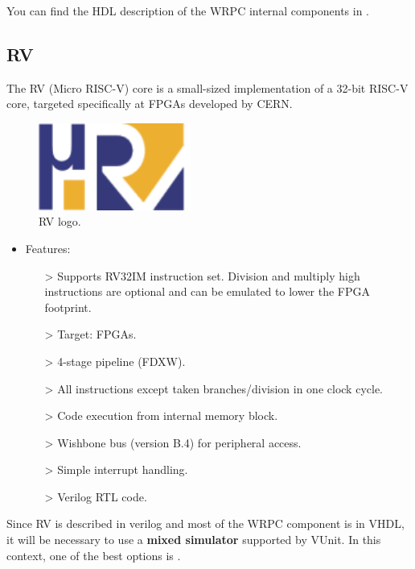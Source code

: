 \noindent You can find the HDL description of the WRPC internal components in \cite{WRPC:modules}.

\newpage

\subsection{\textmu RV}

The \textmu RV \cite{urv-core:ohwr} \cite{urv-core:wiki} \cite{Włostowski:2213516} (Micro RISC-V) core is a small-sized implementation of a 32-bit RISC-V core, targeted specifically at FPGAs developed by CERN. 

\begin{figure}[H]
    \centering
    \includegraphics[width=5cm]{figures/urv_logo.png}
    \caption{\textmu RV logo.}
    \label{fig:urv}
\end{figure}

\begin{itemize}
\item Features:
    \begin{itemize}
    \item[>] Supports RV32IM instruction set. 
Division and multiply high instructions are optional and can be emulated to lower the FPGA footprint.
    \item[>] Target: FPGAs.
    \item[>] 4-stage pipeline (FDXW).
    \item[>] All instructions except taken branches/division in one clock cycle.
    \item[>] Code execution from internal memory block.
    \item[>] Wishbone bus (version B.4) for peripheral access.
    \item[>] Simple interrupt handling.
    \item[>] Verilog RTL code.
    \end{itemize}
\end{itemize}

\noindent Since \textmu RV is described in verilog and most of the WRPC component is in VHDL, it will be necessary to use a \textbf{mixed simulator} supported by VUnit.
In this context, one of the best options is .
